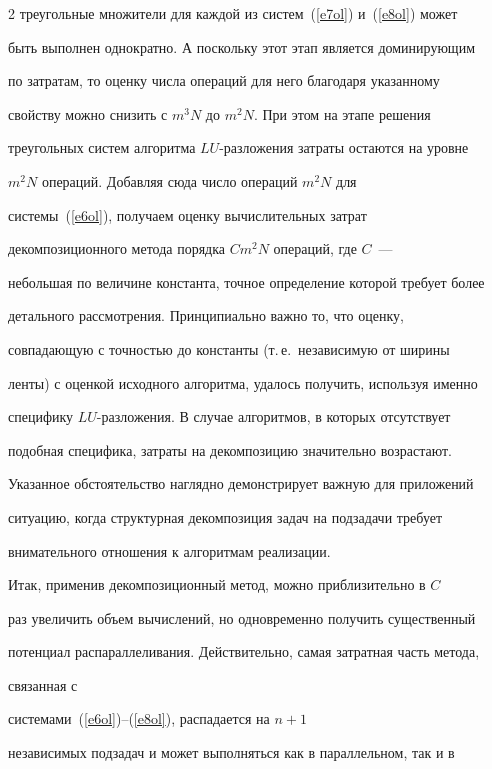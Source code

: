 \begin{multicols}{2}
треугольные множители для каждой из систем~(\ref{e7ol}) и~(\ref{e8ol}) может


быть выполнен однократно. А поскольку этот этап является доми\-ни\-ру\-ющим


по затратам, то оценку числа операций для него благодаря указанному


свойству можно снизить с $m^3N$ до $m^2N$. При этом на этапе решения


треугольных систем алгоритма $LU$-разложения затраты остаются на уровне


$m^2N$ операций. До\-бав\-ляя сюда число операций $m^2N$ для


системы~(\ref{e6ol}), получаем оценку вычислительных затрат


декомпозиционного метода порядка $Cm^2N$ операций, где $C$~---


небольшая по величине константа, точное определение которой требует более


детального рассмотрения. Принципиально важно то, что оценку,


совпадающую с точностью до константы (т.\,е.\ независимую от ширины


ленты) с оценкой исходного алгоритма, удалось получить, используя именно


специфику $LU$-разложения. В случае алгоритмов, в которых отсутствует


подобная специфика, затраты на декомпозицию значительно возрастают.


Указанное обстоятельство наглядно демонстрирует важную для приложений


ситуацию, когда структурная декомпозиция задач на подзадачи требует


внимательного отношения к алгоритмам реализации.





     Итак, применив декомпозиционный метод, можно приблизительно в $C$


раз увеличить объем вычис\-ле\-ний, но одновременно получить существенный


потенциал распараллеливания. Действительно, самая затратная часть метода,


связанная с %


 сис\-те\-ма\-ми~(\ref{e6ol})--(\ref{e8ol}), распадается на $n + 1$


независимых подзадач и может выполняться как в параллельном, так и в



\end{multicols}
